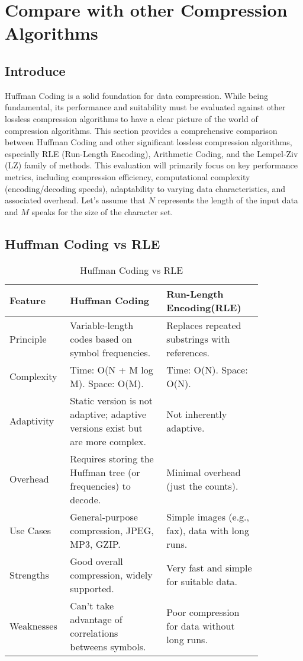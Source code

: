 \section{Compare with other Compression Algorithms}
\subsection{Introduce}
Huffman Coding is a solid foundation for data compression. While being fundamental, its performance and suitability must be evaluated against other lossless compression algorithms to have a clear picture of the world of compression algorithms. This section provides a comprehensive comparison between Huffman Coding and other significant lossless compression algorithms, especially RLE (Run-Length Encoding), Arithmetic Coding, and the Lempel-Ziv (LZ) family of methods. This evaluation will primarily focus on key performance metrics, including compression efficiency, computational complexity (encoding/decoding speeds), adaptability to varying data characteristics, and associated overhead.\newline
Let's assume that \(N\) represents the length of the input data and \(M\) speaks for the size of the character set.
\subsection{Huffman Coding vs RLE}
\begin{table}[H]
    \centering
    \renewcommand{\arraystretch}{1.5}
    \setlength{\tabcolsep}{8pt} %
    \begin{tabular}{|p{0.15\linewidth}|p{0.35\linewidth}|p{0.35\linewidth}|}
        \hline
        \rowcolor{gray!30}
        \textbf{Feature} & \textbf{Huffman Coding} & \textbf{Run-Length Encoding(RLE)}\\
        \hline
        Principle & Variable-length codes based on symbol frequencies. & Replaces repeated substrings with references.\\\hline
        Complexity & Time:   O(N + M log M). \newline Space: O(M). &Time:   O(N). \newline Space: O(N).\\\hline
        Adaptivity & Static version is not adaptive; adaptive versions exist but are more complex. & Not inherently adaptive.\\\hline
        Overhead & Requires storing the Huffman tree (or frequencies) to decode. & Minimal overhead (just the counts).\\\hline
        Use Cases & General-purpose compression, JPEG, MP3, GZIP. & Simple images (e.g., fax), data with long runs.\\\hline
        Strengths & Good overall compression, widely supported. & Very fast and simple for suitable data.\\\hline
        Weaknesses & Can’t take advantage of correlations betweens symbols. & Poor compression for data without long runs.\\\hline
    \end{tabular}
    \caption{Huffman Coding vs RLE}
    \label{tab:Huffman_vs_RLE}
\end{table}
